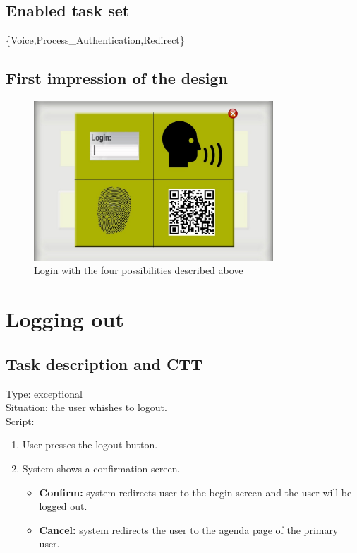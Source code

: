 \documentclass[11pt, a4paper,svglistings]{report}
\begin{document}
\subsection{Enabled task set}

\{Voice,Process\_Authentication,Redirect\}

\subsection{First impression of the design}

\begin{figure}[H]
\centering
    \includegraphics[width=0.8\textwidth]{Login.jpg}
  \caption[Login screen]{\label{fig:Login}Login with the four possibilities described above}
\end{figure}



\newpage

\section{Logging out}

\subsection{Task description and CTT}

Type: exceptional \\
Situation: the user whishes to logout. \\
Script:
\begin{enumerate}
\item User presses the logout button.
\item System shows a confirmation screen.
\begin{itemize}
\item \textbf{Confirm:} system redirects user to the begin screen and the user will be logged out.
\item \textbf{Cancel:} system redirects the user to the agenda page of the primary user.
\end{itemize}
\end{enumerate}
\end{document}
